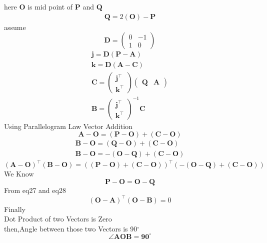 \documentclass[journal,10pt,twocolumn]{article}
\let\vec\mathbf
\newcommand{\myvec}[1]{\ensuremath{\begin{pmatrix}#1\end{pmatrix}}}
\begin{document}
here $\boldsymbol{O}$ is mid point of $\boldsymbol{P}$ and $\boldsymbol{Q}$
\begin{eqnarray}
	\vec{Q}=2(\vec{O})-\vec{P}
	\end{eqnarray}
	assume 
	\begin{equation}
	\vec{D}=\myvec{0&-1\\1&0}
	\end{equation}
\begin{eqnarray}
	\vec{j} = \vec{D}(\vec{P-A})\\
	\vec{k} =\vec{D}(\vec{A-C})\\
	\vec{C}=\myvec{\vec{j^\top}\\\vec{k^\top}}\myvec{\vec{Q} & \vec{A}}\\
	\vec{B}=\myvec{\vec{j^\top}\\\vec{k^\top}}^{-1}\vec{C}
\end{eqnarray}
Using Parallelogram Law Vector Addition
\begin{equation}
	\vec{A-O}=(\vec{P-O})+(\vec{C-O})    
\end{equation}
\begin{eqnarray}
	\vec{B-O}=(\vec{Q-O})+(\vec{C-O})\\
	\vec{B-O}=-(\vec{O-Q})+(\vec{C-O})
\end{eqnarray}
\begin{equation}
	(\vec{A-O})^\top(\vec{B-O})=((\vec{P-O})+(\vec{C-O}))^\top(-(\vec{O-Q})+(\vec{C-O}))
\end{equation}
We Know
\begin{equation}
    \vec{P-O}=\vec{O-Q}
\end{equation}
From eq27 and eq28
\begin{equation}
	(\vec{O-A})^\top(\vec{O-B})=0
\end{equation}
Finally\\
Dot Product of two  Vectors is Zero\\
then,Angle between those two Vectors is  90$^{\circ}$
\begin{equation}
    \angle{\boldsymbol{AOB}}=\boldsymbol{ 90^{\circ}}
\end{equation}
\end{document}

